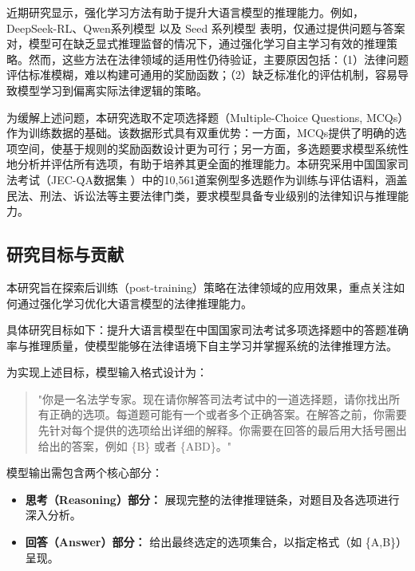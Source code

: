 \documentclass{article}
\begin{document}
近期研究显示，强化学习方法有助于提升大语言模型的推理能力。例如，DeepSeek-RL\cite{guo2025deepseek}、Qwen系列模型\cite{yang2024qwen2} 以及 Seed 系列模型\cite{seed2025seed} 表明，仅通过提供问题与答案对，模型可在缺乏显式推理监督的情况下，通过强化学习自主学习有效的推理策略。然而，这些方法在法律领域的适用性仍待验证，主要原因包括：（1）法律问题评估标准模糊，难以构建可通用的奖励函数；（2）缺乏标准化的评估机制，容易导致模型学习到偏离实际法律逻辑的策略。

为缓解上述问题，本研究选取不定项选择题（Multiple-Choice Questions, MCQs）作为训练数据的基础。该数据形式具有双重优势：一方面，MCQs提供了明确的选项空间，使基于规则的奖励函数设计更为可行；另一方面，多选题要求模型系统性地分析并评估所有选项，有助于培养其更全面的推理能力。本研究采用中国国家司法考试（JEC-QA数据集 \cite{zhong2020jec}）中的10,561道案例型多选题作为训练与评估语料，涵盖民法、刑法、诉讼法等主要法律门类，要求模型具备专业级别的法律知识与推理能力。

\subsection{研究目标与贡献}

本研究旨在探索后训练（post-training）策略在法律领域的应用效果，重点关注如何通过强化学习优化大语言模型的法律推理能力。

具体研究目标如下：提升大语言模型在中国国家司法考试多项选择题中的答题准确率与推理质量，使模型能够在法律语境下自主学习并掌握系统的法律推理方法。

为实现上述目标，模型输入格式设计为：
\begin{quote}
"你是一名法学专家。现在请你解答司法考试中的一道选择题，请你找出所有正确的选项。每道题可能有一个或者多个正确答案。在解答之前，你需要先针对每个提供的选项给出详细的解释。你需要在回答的最后用大括号圈出给出的答案，例如 \{B\} 或者 \{ABD\}。"
\end{quote}

模型输出需包含两个核心部分：
\begin{itemize}
\item \textbf{思考（Reasoning）部分：} 展现完整的法律推理链条，对题目及各选项进行深入分析。
\item \textbf{回答（Answer）部分：} 给出最终选定的选项集合，以指定格式（如 \{A,B\}）呈现。
\end{itemize}
\end{document}
